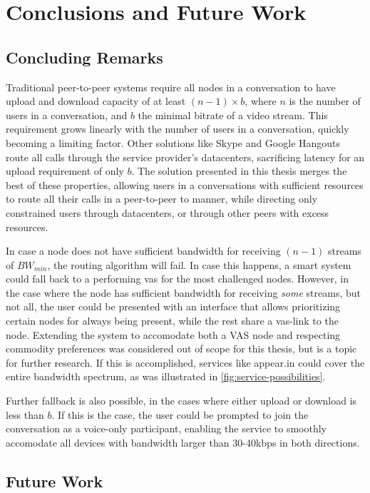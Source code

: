 \chapter{Conclusions and Future Work}\label{chp:conclusions}


\section{Concluding Remarks}\label{sec:conclusions}

Traditional peer-to-peer systems require all nodes in a conversation to have upload and download capacity of at least $(n-1) \times b$, where $n$ is the number of users in a conversation, and $b$ the minimal bitrate of a video stream. This requirement grows linearly with the number of users in a conversation, quickly becoming a limiting factor. Other solutions like Skype and Google Hangouts route all calls through the service provider's datacenters, sacrificing latency for an upload requirement of only $b$. The solution presented in this thesis merges the best of these properties, allowing users in a conversations with sufficient resources to route all their calls in a peer-to-peer to manner, while directing only constrained users through datacenters, or through other peers with excess resources.

In case a node does not have sufficient bandwidth for receiving $(n-1)$ streams of $BW_{min}$, the routing algorithm will fail. In case this happens, a smart system could fall back to a performing \gls{vas} for the most challenged nodes. However, in the case where the node has sufficient bandwidth for receiving \emph{some} streams, but not all, the user could be presented with an interface that allows prioritizing certain nodes for always being present, while the rest share a \gls{vas}-link to the node. Extending the system to accomodate both a VAS node and respecting commodity preferences was considered out of scope for this thesis, but is a topic for further research. If this is accomplished, services like appear.in could cover the entire bandwidth spectrum, as was illustrated in \autoref{fig:service-possibilities}.

Further fallback is also possible, in the cases where either upload or download is less than $b$. If this is the case, the user could be prompted to join the conversation as a voice-only participant, enabling the service to smoothly accomodate all devices with bandwidth larger than 30-40kbps in both directions.


\section{Future Work}\label{sec:future_work}

